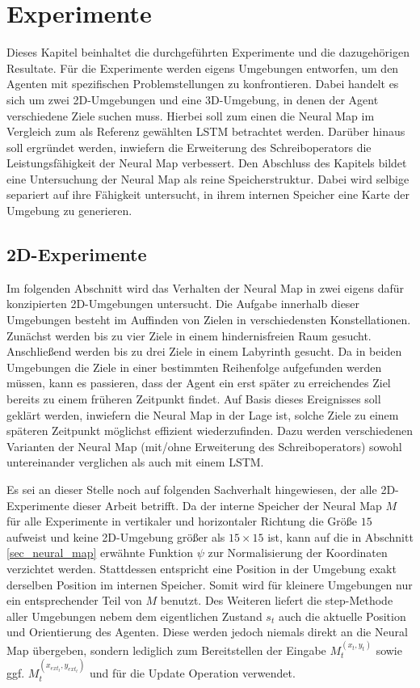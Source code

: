 \chapter{Experimente}

Dieses Kapitel beinhaltet die durchgeführten Experimente und die dazugehörigen Resultate. Für die Experimente werden eigens Umgebungen entworfen, um den Agenten mit spezifischen Problemstellungen zu konfrontieren. Dabei handelt es sich um zwei 2D-Umgebungen und eine 3D-Umgebung, in denen der Agent verschiedene Ziele suchen muss. Hierbei soll zum einen die Neural Map im Vergleich zum als Referenz gewählten LSTM betrachtet werden. Darüber hinaus soll ergründet werden, inwiefern die Erweiterung des Schreiboperators die Leistungsfähigkeit der Neural Map verbessert. Den Abschluss des Kapitels bildet eine Untersuchung der Neural Map als reine Speicherstruktur. Dabei wird selbige separiert auf ihre Fähigkeit untersucht, in ihrem internen Speicher eine Karte der Umgebung zu generieren.


\section{2D-Experimente}

Im folgenden Abschnitt wird das Verhalten der Neural Map in zwei eigens dafür konzipierten 2D-Umgebungen untersucht. Die Aufgabe innerhalb dieser Umgebungen besteht im Auffinden von Zielen in verschiedensten Konstellationen. Zunächst werden bis zu vier Ziele in einem hindernisfreien Raum gesucht. Anschließend werden bis zu drei Ziele in einem Labyrinth gesucht. Da in beiden Umgebungen die Ziele in einer bestimmten Reihenfolge aufgefunden werden müssen, kann es passieren, dass der Agent ein erst später zu erreichendes Ziel bereits zu einem früheren Zeitpunkt findet. Auf Basis dieses Ereignisses soll geklärt werden, inwiefern die Neural Map in der Lage ist, solche Ziele zu einem späteren Zeitpunkt möglichst effizient wiederzufinden. Dazu werden verschiedenen Varianten der Neural Map (mit/ohne Erweiterung des Schreiboperators) sowohl untereinander verglichen als auch mit einem LSTM.

Es sei an dieser Stelle noch auf folgenden Sachverhalt hingewiesen, der alle 2D-Experimente dieser Arbeit betrifft. Da der interne Speicher der Neural Map $M$ für alle Experimente in vertikaler und horizontaler Richtung die Größe $15$ aufweist und keine 2D-Umgebung größer als $15 \times 15$ ist, kann auf die in Abschnitt \ref{sec_neural_map} erwähnte Funktion $\psi$ zur Normalisierung der Koordinaten verzichtet werden. Stattdessen entspricht eine Position in der Umgebung exakt derselben Position im internen Speicher. Somit wird für kleinere Umgebungen nur ein entsprechender Teil von $M$ benutzt. Des Weiteren liefert die step-Methode aller Umgebungen nebem dem eigentlichen Zustand $s_t$ auch die aktuelle Position und Orientierung des Agenten. Diese werden jedoch niemals direkt an die Neural Map übergeben, sondern lediglich zum Bereitstellen der Eingabe $M_t^{(x_t,y_t)}$ sowie ggf. $M_t^{(x_{ext_t},y_{ext_t})}$ und für die Update Operation verwendet.

